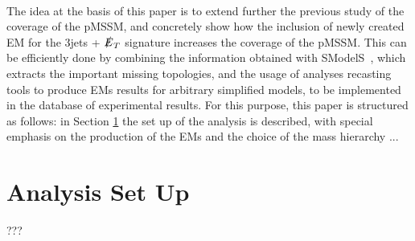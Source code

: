 \documentclass[a4paper,11pt]{article}
\newcommand{\SMO}{{\sc SModelS}}
\begin{document}
\\
The idea at the basis of this paper is to extend further the previous study of the coverage of the pMSSM, and concretely show how the inclusion of newly created EM for the 3jets + $\slashed{E}_T$ signature increases the coverage of the pMSSM. This can be efficiently done by combining the information obtained with \SMO~, which extracts the important missing topologies, and the usage of analyses recasting tools to produce EMs results for arbitrary simplified models, to be implemented in the database of experimental results. For this purpose, this paper is structured as follows: in Section \ref{sec::setup} the set up of the analysis is described, with special emphasis on the production of the EMs and the choice of the mass hierarchy ... 


\section{Analysis Set Up}\label{sec::setup}
{\color{blue} ??? }
\end{document}
